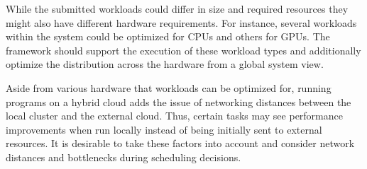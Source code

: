 \begin{description}[style=nextline]
    \item [Workload Diversity]
    While the submitted workloads could differ in size and required resources they might also have different hardware requirements. For instance, several workloads within the system could be optimized for CPUs and others for GPUs. The framework should support the execution of these workload types and additionally optimize the distribution across the hardware from a global system view.

    \item [Location Optimized Scheduling]
    Aside from various hardware that workloads can be optimized for, running programs on a hybrid cloud adds the issue of networking distances between the local cluster and the external cloud. Thus, certain tasks may see performance improvements when run locally instead of being initially sent to external resources. It is desirable to take these factors into account and consider network distances and bottlenecks during scheduling decisions.

\end{description}
